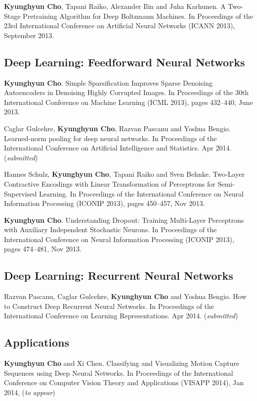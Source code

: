 \documentclass[11pt, oneside]{essay}
\begin{document}
\textbf{Kyunghyun Cho}, Tapani Raiko, Alexander Ilin and Juha
Karhunen. A Two-Stage Pretraining Algorithm for Deep
Boltzmann Machines. In Proceedings of the 23rd International
Conference on Artificial Neural Networks (ICANN 2013),
September 2013.



\subsection{Deep Learning: Feedforward Neural Networks}

\textbf{Kyunghyun Cho}. Simple Sparsification Improves Sparse
Denoising Autoencoders in Denoising Highly Corrupted Images.
In Proceedings of the 30th International Conference on
Machine Learning (ICML 2013), pages 432--440, June 2013.

Caglar Gulcehre, \textbf{Kyunghyun Cho}, Razvan Pascanu and Yoshua Bengio.
Learned-norm pooling for deep neural networks. 
In Proceedings of the International Conference on Artificial
Intelligence and Statistics. Apr 2014. (\textit{submitted})

Hannes Schulz, \textbf{Kyunghyun Cho}, Tapani Raiko and Sven Behnke.
Two-Layer Contractive Encodings with Linear Transformation
of Perceptrons for Semi-Supervised Learning. 
In Proceedings of the International Conference on Neural
Information Processing (ICONIP 2013), pages 450--457, Nov 2013.

\textbf{Kyunghyun Cho}.
Understanding Dropout: Training Multi-Layer Perceptrons with
Auxiliary Independent Stochastic Neurons. 
In Proceedings of the International Conference on Neural
Information Processing (ICONIP 2013), pages 474--481, Nov 2013.

\subsection{Deep Learning: Recurrent Neural Networks}

Razvan Pascanu, Caglar Gulcehre, \textbf{Kyunghyun Cho} and Yoshua Bengio.
How to Construct Deep Recurrent Neural Networks. 
In Proceedings of the International Conference on Learning
Representations. Apr 2014. (\textit{submitted})


\subsection{Applications}

\textbf{Kyunghyun Cho} and Xi Chen.  Classifying and
Visualizing Motion Capture Sequences using Deep Neural
Networks.  In Proceedings of the International Conference on
Computer Vision Theory and Applications (VISAPP 2014), Jan
2014, (\textit{to appear})
\end{document}
